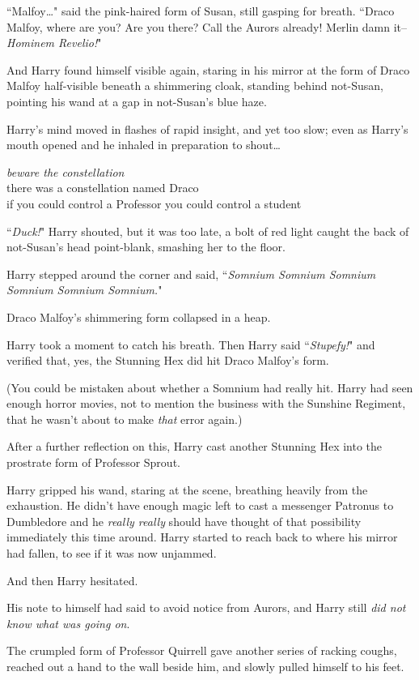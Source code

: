 ``Malfoy{\ldots}" said the pink-haired form of Susan, still gasping for breath. ``Draco Malfoy, where are you? Are you there? Call the Aurors already! Merlin damn it\---\emph{Hominem Revelio!}"

And Harry found himself visible again, staring in his mirror at the form of Draco Malfoy half-visible beneath a shimmering cloak, standing behind not-Susan, pointing his wand at a gap in not-Susan's blue haze.

Harry's mind moved in flashes of rapid insight, and yet too slow; even as Harry's mouth opened and he inhaled in preparation to shout{\ldots}

\noindent{}\emph{beware the constellation}\\
there was a constellation named Draco\\
if you could control a Professor you could control a student

``\emph{Duck!}" Harry shouted, but it was too late, a bolt of red light caught the back of not-Susan's head point-blank, smashing her to the floor.

Harry stepped around the corner and said, ``\emph{Somnium Somnium Somnium Somnium Somnium Somnium.}"

Draco Malfoy's shimmering form collapsed in a heap.

Harry took a moment to catch his breath. Then Harry said ``\emph{Stupefy!}" and verified that, yes, the Stunning Hex did hit Draco Malfoy's form.

(You could be mistaken about whether a Somnium had really hit. Harry had seen enough horror movies, not to mention the business with the Sunshine Regiment, that he wasn't about to make \emph{that} error again.)

After a further reflection on this, Harry cast another Stunning Hex into the prostrate form of Professor Sprout.

Harry gripped his wand, staring at the scene, breathing heavily from the exhaustion. He didn't have enough magic left to cast a messenger Patronus to Dumbledore and he \emph{really really} should have thought of that possibility immediately this time around. Harry started to reach back to where his mirror had fallen, to see if it was now unjammed.

And then Harry hesitated.

His note to himself had said to avoid notice from Aurors, and Harry still \emph{did not know what was going on}.

The crumpled form of Professor Quirrell gave another series of racking coughs, reached out a hand to the wall beside him, and slowly pulled himself to his feet.

